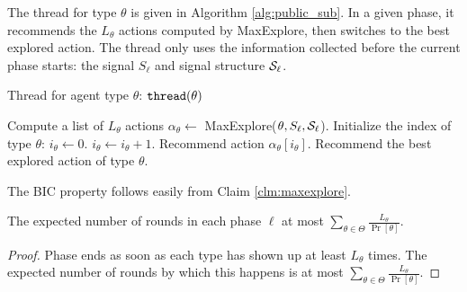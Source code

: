 The thread for type $\theta$ is given in Algorithm \ref{alg:public_sub}. In a given phase, it recommends the $L_{\theta}$ actions computed by MaxExplore, then switches to the best explored action. The thread only uses the information collected before the current phase starts: the signal $S_\ell$ and signal structure $\S_\ell$.

 \begin{algorithm}[H]
    \caption{Thread for agent type $\theta$: $\thread(\theta)$ }
    	\label{alg:public_sub}
    \begin{algorithmic}[1]
			\STATE Compute a list of $L_{\theta}$ actions $\alpha_{\theta} \leftarrow $ MaxExplore($\theta, S_\ell, \S_\ell$).
			\STATE Initialize the index of type $\theta$: $i_{\theta} \leftarrow 0$.
		\ENDIF
		\STATE $i_{\theta} \leftarrow i_{\theta} + 1$.
			\STATE Recommend action $\alpha_{\theta} [i_{\theta}]$.
		\ELSE
			\STATE Recommend the best explored action of type $\theta$.
		\ENDIF
     \end{algorithmic}
\end{algorithm}

The BIC property follows easily from Claim \ref{clm:maxexplore}.


\begin{lemma}
\label{lem:epoch}
The expected number of rounds in each phase $\ell$ at most
$ \sum_{\theta\in\varTheta} \frac{L_{\theta}}{\Pr[\theta]}$.
\end{lemma}

\begin{proof}
Phase ends as soon as each type has shown up at least $L_{\theta}$ times. The expected number of rounds by which this happens is at most
$ \sum_{\theta\in\varTheta} \frac{L_{\theta}}{\Pr[\theta]}$.
\end{proof}


